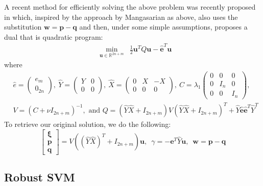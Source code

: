 \documentclass[11pt]{article}
\newcommand{\ds}{\displaystyle}
\begin{document}
A recent method for efficiently solving the above problem was recently proposed in \cite{pqsvm} which, inspired by the approach by Mangasarian as above, also uses the substitution $\bm{w} = \bm{p} - \bm{q}$ and then, under some simple assumptions, proposes a dual that is quadratic program:
\begin{eqnarray*}
& \ds\min_{\bm{u}\in\mathbb{R}^{2n+m}} & \frac{1}{2}\bm{u}^T Q \bm{u} - \hat{\bm{e}}^T\bm{u}
\end{eqnarray*}
where
{\allowdisplaybreaks
\begin{align*}
& \hat{e} = \begin{pmatrix} e_m \\ 0_{2n} \end{pmatrix}, \ \hat{Y} = \begin{pmatrix} Y & 0 \\ 0 & 0 \end{pmatrix}, \ \hat{X} = \begin{pmatrix} 0 & X & -X \\ 0 & 0 & 0 \end{pmatrix}, \ C = \lambda_1\begin{pmatrix} 0 & 0 & 0 \\ 0 & I_n & 0 \\ 0 & 0 & I_n \end{pmatrix}, 
\\
& V = \left(C + \nu I_{2n+m}\right)^{-1}, \mbox{  and  } Q = \left(\hat{Y}\hat{X} + I_{2n+m}\right)V\left(\hat{Y}\hat{X}+I_{2n+m}\right)^T + \hat{Y}\hat{\bm{e}}\hat{\bm{e}}^T\hat{Y}^T
\end{align*}}
To retrieve our original solution, we do the following:
\[
\begin{bmatrix} \bm{\xi} \\ \bm{p} \\ \bm{q} \end{bmatrix} = V\left(\left(\hat{Y}\hat{X}\right)^T + I_{2n+m}\right)\bm{u}, \enspace \gamma = -\bm{e}^T\hat{Y}\bm{u}, \enspace \bm{w} = \bm{p} - \bm{q}
\]

\subsection{Robust SVM \cite{rsvm}}
\end{document}
